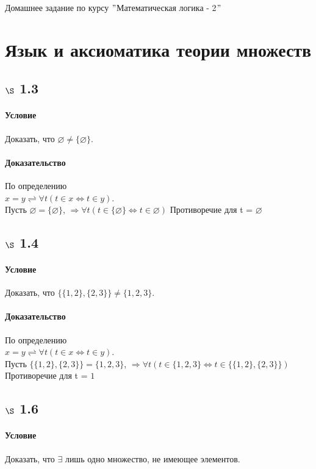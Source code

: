\documentclass[a4paper,12pt]{article}
\begin{document}
\begin{center}
\Huge{Домашнее задание по курсу $"$Математическая логика - 2$"$}
\end{center}

\section{Язык и аксиоматика теории множеств}
\subsection*{$\S$ 1.3}
\paragraph*{Условие}
Доказать, что $\varnothing \not= 	\{ \varnothing \}.$
\paragraph*{Доказательство}
По определению\\
$ x = y \rightleftharpoons \forall t ( t \in x \Leftrightarrow t \in y ).$\\
Пусть $\varnothing = 	\{ \varnothing \} $,
$ \Rightarrow \forall t ( t \in \{ \varnothing \} \Leftrightarrow t \in \varnothing )$
Противоречие для t = $ \varnothing $

\subsection*{$\S$ 1.4}
\paragraph*{Условие}
Доказать, что $\{\{1, 2\}, \{2,3\}\} \not= 	\{ 1,2,3 \}. $
\paragraph*{Доказательство}
По определению\\
$ x = y \rightleftharpoons \forall t ( t \in x \Leftrightarrow t \in y ).$\\
Пусть $\{\{1, 2\}, \{2,3\}\} = 	\{ 1,2,3 \} $,
$ \Rightarrow \forall t ( t \in \{ 1,2,3 \} \Leftrightarrow t \in \{\{1, 2\}, \{2,3\}\} )$
Противоречие для t = $ 1 $

\subsection*{$\S$ 1.6}
\paragraph*{Условие}
Доказать, что $\exists$ лишь одно множество, не имеющее элементов.
\end{document}

